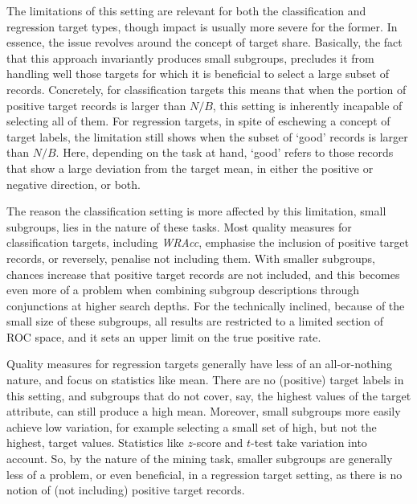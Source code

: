\documentclass[smallextended]{svjour3}
\newcommand{\qm}{\emph}
\begin{document}
The limitations of this setting are relevant for both the classification and regression target types, though impact is usually more severe for the former.
In essence, the issue revolves around the concept of target share.
Basically, the fact that this approach invariantly produces small subgroups, precludes it from handling well those targets for which it is beneficial to select a large subset of records.
Concretely, for classification targets this means that when the portion of positive target records is larger than $N/B$, this setting is inherently incapable of selecting all of them.
For regression targets, in spite of eschewing a concept of target labels, the limitation still shows when the subset of `good' records is larger than $N/B$.
Here, depending on the task at hand, `good' refers to those records that show a large deviation from the target mean, in either the positive or negative direction, or both.

The reason the classification setting is more affected by this limitation, small subgroups, lies in the nature of these tasks.
Most quality measures for classification targets, including \qm{WRAcc}, emphasise the inclusion of positive target records, or reversely, penalise not including them.
With smaller subgroups, chances increase that positive target records are not included, and this becomes even more of a problem when combining subgroup descriptions through conjunctions at higher search depths.
For the technically inclined, because of the small size of these subgroups, all results are restricted to a limited section of ROC space, and it sets an upper limit on the true positive rate.

Quality measures for regression targets generally have less of an all-or-nothing nature, and focus on statistics like mean.
There are no (positive) target labels in this setting, and subgroups that do not cover, say, the highest values of the target attribute, can still produce a high mean.
Moreover, small subgroups more easily achieve low variation, for example selecting a small set of high, but not the highest, target values.
Statistics like $z$-score and $t$-test take variation into account.
So, by the nature of the mining task, smaller subgroups are generally less of a problem, or even beneficial, in a regression target setting, as there is no notion of (not including) positive target records.





\end{document}
